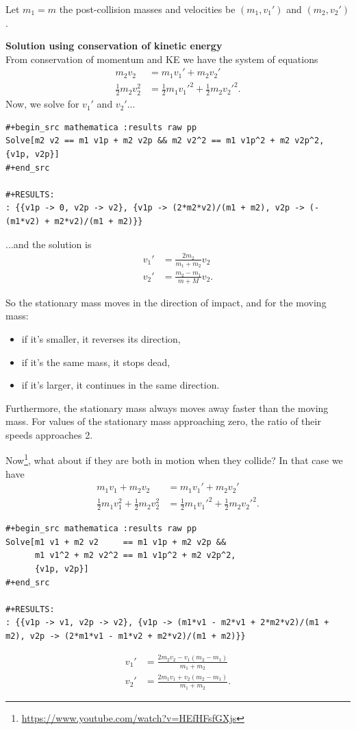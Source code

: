 Let $m_1 = m$ the post-collision masses and velocities be $(m_1, v_1')$ and $(m_2, v_2')$.

{\bf Solution using conservation of kinetic energy}\\

From conservation of momentum and KE we have the system of equations
\begin{align}
  m_2v_2              &= m_1v_1' + m_2v_2' \\
  \frac{1}{2}m_2v_2^2 &= \frac{1}{2}m_1v_1'^2 + \frac{1}{2}m_2v_2'^2.
\end{align}
Now, we solve for $v_1'$ and $v_2'$...

\begin{verbatim}
#+begin_src mathematica :results raw pp
Solve[m2 v2 == m1 v1p + m2 v2p && m2 v2^2 == m1 v1p^2 + m2 v2p^2, {v1p, v2p}]
#+end_src

#+RESULTS:
: {{v1p -> 0, v2p -> v2}, {v1p -> (2*m2*v2)/(m1 + m2), v2p -> (-(m1*v2) + m2*v2)/(m1 + m2)}}
\end{verbatim}
...and the solution is
\begin{align*}
  v_1' &= \frac{2m_2}{m_1 + m_2}v_2 \\
  v_2' &= \frac{m_2 - m_1}{m + M}v_2.
\end{align*}

So the stationary mass moves in the direction of impact, and for the moving mass:
\begin{itemize}
\item if it's smaller, it reverses its direction,
\item if it's the same mass, it stops dead,
\item if it's larger, it continues in the same direction.
\end{itemize}
Furthermore, the stationary mass always moves away faster than the moving mass. For values of the
stationary mass approaching zero, the ratio of their speeds approaches 2.


Now\footnote{\url{https://www.youtube.com/watch?v=HEfHFsfGXjs}}, what about if they are both in
motion when they collide? In that case we have
\begin{align}
  m_1v_1 + m_2v_2                           &= m_1v_1' + m_2v_2' \\
  \frac{1}{2}m_1v_1^2 + \frac{1}{2}m_2v_2^2 &= \frac{1}{2}m_1v_1'^2 + \frac{1}{2}m_2v_2'^2.
\end{align}
\begin{verbatim}
#+begin_src mathematica :results raw pp
Solve[m1 v1 + m2 v2     == m1 v1p + m2 v2p &&
      m1 v1^2 + m2 v2^2 == m1 v1p^2 + m2 v2p^2,
      {v1p, v2p}]
#+end_src

#+RESULTS:
: {{v1p -> v1, v2p -> v2}, {v1p -> (m1*v1 - m2*v1 + 2*m2*v2)/(m1 + m2), v2p -> (2*m1*v1 - m1*v2 + m2*v2)/(m1 + m2)}}
\end{verbatim}
\begin{align*}
  v_1' &= \frac{2m_2v_2 - v_1(m_2 - m_1)}{m_1 + m_2} \\
  v_2' &= \frac{2m_1v_1 + v_2(m_2 - m_1)}{m_1 + m_2}.
\end{align*}

